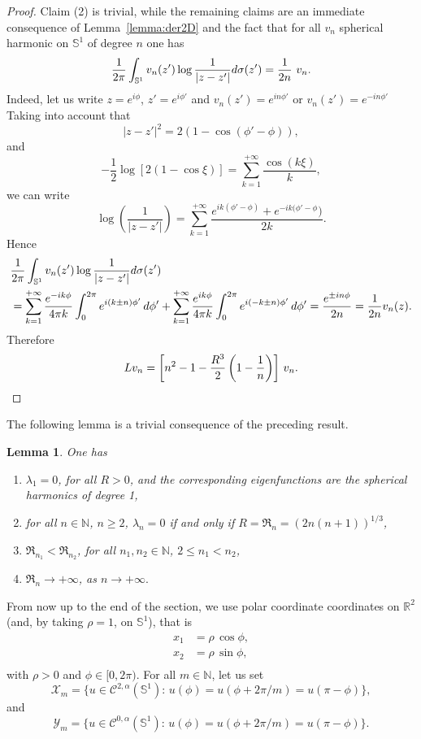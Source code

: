 \documentclass[10pt,reqno,english]{amsart}
\newcommand{\Su}{\mathbb{S}^1}
\newcommand{\N}{\mathbb{N}}
\newcommand{\R} {\mathbb R}
\newtheorem{lemma}{Lemma}[section]
\theoremstyle{definition}
\numberwithin{equation}{section}
\begin{document}
\begin{proof}
Claim (2) is trivial, while the remaining claims are an immediate consequence of Lemma~\ref{lemma:der2D} and the fact that for all $v_n$ spherical harmonic on $\Su$ of degree $n$ one has
\[
{1\over 2\pi}  \int_{\mathbb{S}^1} v_n (z') \log {1\over |z-z'|} d\sigma (z') ={1\over 2n} \,  \, v_n.
\]
Indeed, let us write $z=e^{i\phi}$, $z'=e^{i\phi'}$ and $v_n(z')=e^{in\phi'}$ or $v_n(z')=e^{-in\phi'}$
Taking into account that
\[
|z-z'|^2=2(1-\cos(\phi'-\phi)),
\]
and~\cite[Formula 1.441.2 page 46]{GRbook}
\[
-\frac{1}{2}\log[2(1-\cos\xi)]=\sum_{k=1}^{+\infty}\frac{\cos(k\xi)}{k},
\]
we can write
\[
\log\left(\frac{1}{|z-z'|}\right)=\sum_{k=1}^{+\infty}\frac{e^{ik(\phi'-\phi)}+e^{-ik(\phi'-\phi})}{2k}.
\]
Hence
\begin{align*}
    &{1\over 2\pi}  \int_{\mathbb{S}^1} v_n (z') \log {1\over |z-z'|} d\sigma (z')\\
    &=\sum_{k=1}^{+\infty}\frac{e^{-ik\phi}}{4\pi k}\int_0^{2\pi}e^{i(k\pm n)\phi'}\,d\phi'+\sum_{k=1}^{+\infty}\frac{e^{ik\phi}}{4\pi k}\int_0^{2\pi}e^{i(-k\pm n)\phi'}\,d\phi'=\frac{e^{\pm i n\phi}}{2n}=\frac1{2n}v_n (z).
\end{align*}
Therefore
\[
L v_n =\left[n^2-1-{R^3 \over 2}\left(1-\frac1n\right) \right]\, v_n.\qedhere
\]
\end{proof}

The following lemma is a trivial consequence of the preceding result.

\begin{lemma}
\label{lemma:autov-log}
One has
\begin{enumerate}
\item $\lambda_1=0$, for all $R>0$, and the corresponding eigenfunctions are the spherical harmonics of degree 1,
\item for all $n\in\N$, $n\ge2$, $\lambda_n=0$ if and only if $R=\mathfrak R_n=(2n(n+1))^{1/3}$,
\item $\mathfrak R_{n_1}<\mathfrak R_{n_2}$, for all  $n_1,n_2\in\N$, $2\leq n_1<n_2$,
\item $\mathfrak R_n\to+\infty$, as $n\to+\infty.$
\end{enumerate}
\end{lemma}





From now up to the end of the section, we use polar coordinate coordinates on $\R^2$ (and, by taking $\rho=1$, on $\Su$), that is
\[
\begin{aligned}
x_1 &=\rho\, \cos\phi, \\
x_2 &=\rho\, \sin\phi,\\
\end{aligned}
\]
with $\rho>0$ and $\phi \in [0,2\pi)$.
For all $m\in\N$, let us set
\[
\mathcal X_m=\{u\in\mathcal C^{2,\alpha}(\Su):\,u(\phi)=u(\phi+2\pi/m)=u(\pi-\phi)\},
\]
and
\[
\mathcal Y_m=\{u\in\mathcal C^{0,\alpha}(\Su):\,u(\phi)=u(\phi+2\pi/m)=u(\pi-\phi)\}.
\]
\end{document}
